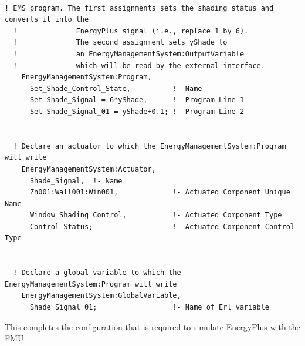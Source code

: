 \begin{lstlisting}

! EMS program. The first assignments sets the shading status and converts it into the
  !              EnergyPlus signal (i.e., replace 1 by 6).
  !              The second assignment sets yShade to
  !              an EnergyManagementSystem:OutputVariable
  !              which will be read by the external interface.
    EnergyManagementSystem:Program,
      Set_Shade_Control_State,          !- Name
      Set Shade_Signal = 6*yShade,      !- Program Line 1
      Set Shade_Signal_01 = yShade+0.1; !- Program Line 2


  ! Declare an actuator to which the EnergyManagementSystem:Program will write
    EnergyManagementSystem:Actuator,
      Shade_Signal,  !- Name
      Zn001:Wall001:Win001,             !- Actuated Component Unique Name
      Window Shading Control,           !- Actuated Component Type
      Control Status;                   !- Actuated Component Control Type


  ! Declare a global variable to which the EnergyManagementSystem:Program will write
    EnergyManagementSystem:GlobalVariable,
      Shade_Signal_01;                  !- Name of Erl variable
\end{lstlisting}

This completes the configuration that is required to simulate EnergyPlus with the FMU.
